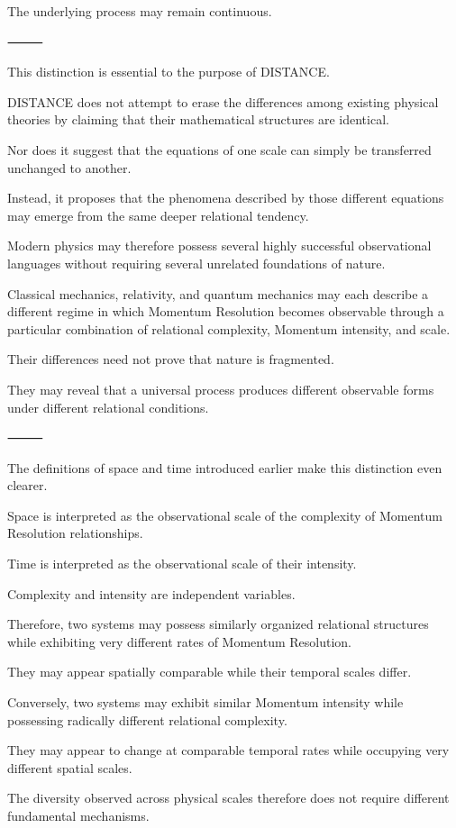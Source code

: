 The underlying process may remain continuous.

⸻

This distinction is essential to the purpose of DISTANCE.

DISTANCE does not attempt to erase the differences among existing physical theories by claiming that their mathematical structures are identical.

Nor does it suggest that the equations of one scale can simply be transferred unchanged to another.

Instead, it proposes that the phenomena described by those different equations may emerge from the same deeper relational tendency.

Modern physics may therefore possess several highly successful observational languages without requiring several unrelated foundations of nature.

Classical mechanics, relativity, and quantum mechanics may each describe a different regime in which Momentum Resolution becomes observable through a particular combination of relational complexity, Momentum intensity, and scale.

Their differences need not prove that nature is fragmented.

They may reveal that a universal process produces different observable forms under different relational conditions.

⸻

The definitions of space and time introduced earlier make this distinction even clearer.

Space is interpreted as the observational scale of the complexity of Momentum Resolution relationships.

Time is interpreted as the observational scale of their intensity.

Complexity and intensity are independent variables.

Therefore, two systems may possess similarly organized relational structures while exhibiting very different rates of Momentum Resolution.

They may appear spatially comparable while their temporal scales differ.

Conversely, two systems may exhibit similar Momentum intensity while possessing radically different relational complexity.

They may appear to change at comparable temporal rates while occupying very different spatial scales.

The diversity observed across physical scales therefore does not require different fundamental mechanisms.

